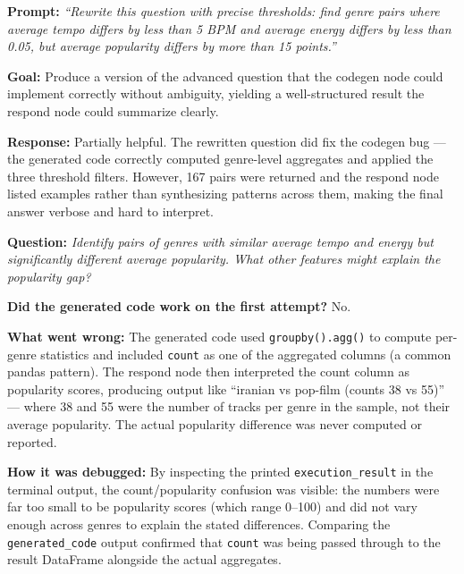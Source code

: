 \documentclass[12pt, oneside]{report}
\begin{document}

\textbf{Prompt:} \textit{``Rewrite this question with precise thresholds: find genre pairs where average tempo differs by less than 5 BPM and average energy differs by less than 0.05, but average popularity differs by more than 15 points.''}

\textbf{Goal:} Produce a version of the advanced question that the codegen node could implement correctly without ambiguity, yielding a well-structured result the respond node could summarize clearly.

\textbf{Response:} Partially helpful. The rewritten question did fix the codegen bug --- the generated code correctly computed genre-level aggregates and applied the three threshold filters. However, 167 pairs were returned and the respond node listed examples rather than synthesizing patterns across them, making the final answer verbose and hard to interpret.



\textbf{Question:} \textit{Identify pairs of genres with similar average tempo and energy but significantly different average popularity. What other features might explain the popularity gap?}

\textbf{Did the generated code work on the first attempt?} No.

\textbf{What went wrong:} The generated code used \texttt{groupby().agg()} to compute per-genre statistics and included \texttt{count} as one of the aggregated columns (a common pandas pattern). The respond node then interpreted the count column as popularity scores, producing output like ``iranian vs pop-film (counts 38 vs 55)'' --- where 38 and 55 were the number of tracks per genre in the sample, not their average popularity. The actual popularity difference was never computed or reported.

\textbf{How it was debugged:} By inspecting the printed \texttt{execution\_result} in the terminal output, the count/popularity confusion was visible: the numbers were far too small to be popularity scores (which range 0--100) and did not vary enough across genres to explain the stated differences. Comparing the \texttt{generated\_code} output confirmed that \texttt{count} was being passed through to the result DataFrame alongside the actual aggregates.
\end{document}
